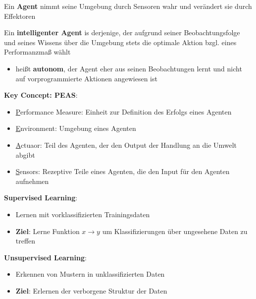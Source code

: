 Ein \textbf{Agent} nimmt seine Umgebung durch Sensoren wahr und verändert sie durch Effektoren

Ein \textbf{intelligenter Agent} is derjenige, der aufgrund seiner Beobachtungsfolge und seines Wissens über die Umgebung stets die optimale Aktion bzgl. eines Performanzmaß wählt
\begin{itemize}
	\item heißt \textbf{autonom}, der Agent eher aus seinen Beobachtungen lernt und nicht auf vorprogrammierte Aktionen angewiesen ist
\end{itemize}

\textbf{Key Concept: PEAS}:
\begin{itemize}
	\item \underline{P}erformance Measure: Einheit zur Definition des Erfolgs eines Agenten
	\item \underline{E}nvironment: Umgebung eines Agenten
	\item \underline{A}ctuaor: Teil des Agenten, der den Output der Handlung an die Umwelt abgibt
	\item \underline{S}ensors: Rezeptive Teile eines Agenten, die den Input für den Agenten aufnehmen
\end{itemize}

\textbf{Supervised Learning}:
\begin{itemize}
	\item Lernen mit vorklassifizierten Trainingsdaten
	\item \textbf{Ziel}: Lerne Funktion $x\rightarrow y$ um Klassifizierungen über ungesehene Daten zu treffen
\end{itemize}

\textbf{Unsupervised Learning}:
\begin{itemize}
	\item Erkennen von Mustern in unklassifizierten Daten
	\item \textbf{Ziel}: Erlernen der verborgene Struktur der Daten
\end{itemize}

